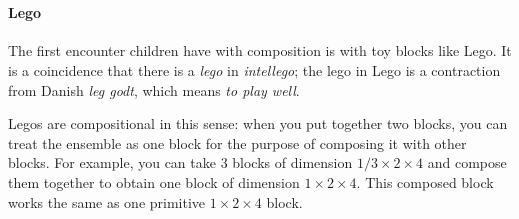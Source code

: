 

\section{}

\paragraph{Lego}

The first encounter children have with composition is with toy blocks like Lego. It is a coincidence that there is a \emph{lego} in \emph{intellego}; the lego in Lego is a contraction from Danish \emph{leg godt}, which means \emph{to play well}.

Legos are compositional in this sense: when you put together two blocks, you can treat the ensemble as one block for the purpose of composing it with other blocks. For example, you can take 3 blocks of dimension $1/3 \times 2 \times 4$ and compose them together to obtain one block of dimension $1 \times 2 \times 4$. This composed block works the same as one primitive  $1 \times 2 \times 4 $ block.

\hfill
{}
\hfill
{}
\hfill


